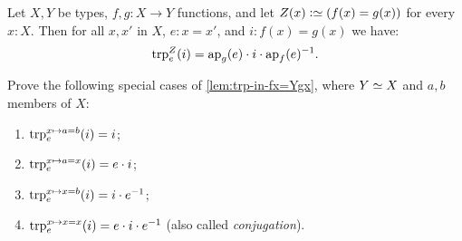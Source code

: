 \begin{lemma}\label{lem:trp-in-fx=Ygx}
Let $X,Y$ be types, $f,g: X\to Y$ functions, and let
$Z(x)\defeq (f(x)=g(x))$ for every $x:X$. 
Then for all $x,x'$ in $X$, $e: x=x'$, and $i: f(x)=g(x)$ we have:
\[
\trp[Z]{ e} (i) = \ap{g}(e) \cdot i \cdot \ap{f}(e)^{-1}.
\]
\end{lemma}

\begin{xca}\label{xca:trp-in-a/x=b/x}
Prove the following special cases of \cref{lem:trp-in-fx=Ygx},
where $Y\jdeq X$ and $a,b$ members of $X$:
\begin{enumerate}
\item $\trp[x\mapsto a=b]{e} (i) = i$;
\item\label{trp-in-a=x} $\trp[x\mapsto a=x]{e} (i) = e\cdot i$;
\item $\trp[x\mapsto x=b]{e} (i) = i \cdot e^{-1}$;
\item \label{trp-in-x=x}$\trp[x\mapsto x=x]{e} (i) = e \cdot i\cdot e^{-1}$ 
(also called \emph{conjugation}).\qedhere
\end{enumerate}
\end{xca}

